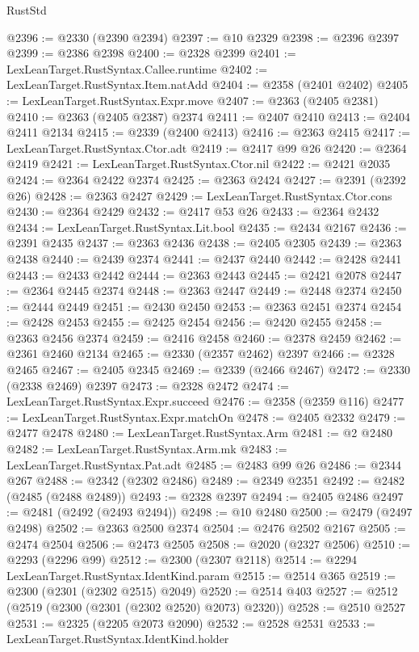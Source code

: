 \begin{lexlean}{RustStd}
\begin{coremodule}
@2396 := @2330 (@2390 @2394)
@2397 := @10 @2329
@2398 := @2396 @2397
@2399 := @2386 @2398
@2400 := @2328 @2399
@2401 := LexLeanTarget.RustSyntax.Callee.runtime
@2402 := LexLeanTarget.RustSyntax.Item.natAdd
@2404 := @2358 (@2401 @2402)
@2405 := LexLeanTarget.RustSyntax.Expr.move
@2407 := @2363 (@2405 @2381)
@2410 := @2363 (@2405 @2387) @2374
@2411 := @2407 @2410
@2413 := @2404 @2411 @2134
@2415 := @2339 (@2400 @2413)
@2416 := @2363 @2415
@2417 := LexLeanTarget.RustSyntax.Ctor.adt
@2419 := @2417 @99 @26
@2420 := @2364 @2419
@2421 := LexLeanTarget.RustSyntax.Ctor.nil
@2422 := @2421 @2035
@2424 := @2364 @2422 @2374
@2425 := @2363 @2424
@2427 := @2391 (@2392 @26)
@2428 := @2363 @2427
@2429 := LexLeanTarget.RustSyntax.Ctor.cons
@2430 := @2364 @2429
@2432 := @2417 @53 @26
@2433 := @2364 @2432
@2434 := LexLeanTarget.RustSyntax.Lit.bool
@2435 := @2434 @2167
@2436 := @2391 @2435
@2437 := @2363 @2436
@2438 := @2405 @2305
@2439 := @2363 @2438
@2440 := @2439 @2374
@2441 := @2437 @2440
@2442 := @2428 @2441
@2443 := @2433 @2442
@2444 := @2363 @2443
@2445 := @2421 @2078
@2447 := @2364 @2445 @2374
@2448 := @2363 @2447
@2449 := @2448 @2374
@2450 := @2444 @2449
@2451 := @2430 @2450
@2453 := @2363 @2451 @2374
@2454 := @2428 @2453
@2455 := @2425 @2454
@2456 := @2420 @2455
@2458 := @2363 @2456 @2374
@2459 := @2416 @2458
@2460 := @2378 @2459
@2462 := @2361 @2460 @2134
@2465 := @2330 (@2357 @2462) @2397
@2466 := @2328 @2465
@2467 := @2405 @2345
@2469 := @2339 (@2466 @2467)
@2472 := @2330 (@2338 @2469) @2397
@2473 := @2328 @2472
@2474 := LexLeanTarget.RustSyntax.Expr.succeed
@2476 := @2358 (@2359 @116)
@2477 := LexLeanTarget.RustSyntax.Expr.matchOn
@2478 := @2405 @2332
@2479 := @2477 @2478
@2480 := LexLeanTarget.RustSyntax.Arm
@2481 := @2 @2480
@2482 := LexLeanTarget.RustSyntax.Arm.mk
@2483 := LexLeanTarget.RustSyntax.Pat.adt
@2485 := @2483 @99 @26
@2486 := @2344 @267
@2488 := @2342 (@2302 @2486)
@2489 := @2349 @2351
@2492 := @2482 (@2485 (@2488 @2489))
@2493 := @2328 @2397
@2494 := @2405 @2486
@2497 := @2481 (@2492 (@2493 @2494))
@2498 := @10 @2480
@2500 := @2479 (@2497 @2498)
@2502 := @2363 @2500 @2374
@2504 := @2476 @2502 @2167
@2505 := @2474 @2504
@2506 := @2473 @2505
@2508 := @2020 (@2327 @2506)
@2510 := @2293 (@2296 @99)
@2512 := @2300 (@2307 @2118)
@2514 := @2294 LexLeanTarget.RustSyntax.IdentKind.param
@2515 := @2514 @365
@2519 := @2300 (@2301 (@2302 @2515) @2049)
@2520 := @2514 @403
@2527 := @2512 (@2519 (@2300 (@2301 (@2302 @2520) @2073) @2320))
@2528 := @2510 @2527
@2531 := @2325 (@2205 @2073 @2090)
@2532 := @2528 @2531
@2533 := LexLeanTarget.RustSyntax.IdentKind.holder

\end{coremodule}
\end{lexlean}
